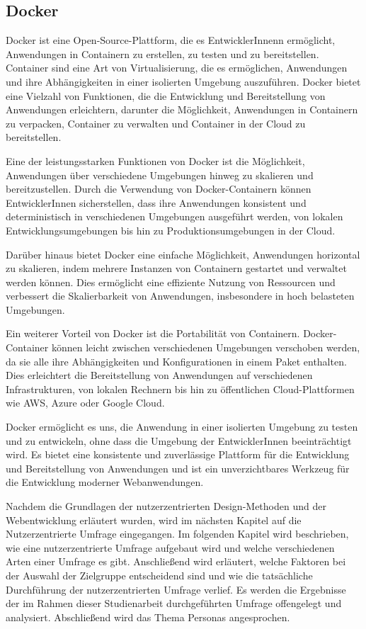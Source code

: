 \subsection{Docker}

Docker ist eine Open-Source-Plattform, die es EntwicklerInnenn ermöglicht, Anwendungen in Containern zu erstellen, zu testen und zu bereitstellen. Container sind eine Art von Virtualisierung, die es ermöglichen, Anwendungen und ihre Abhängigkeiten in einer isolierten Umgebung auszuführen. Docker bietet eine Vielzahl von Funktionen, die die Entwicklung und Bereitstellung von Anwendungen erleichtern, darunter die Möglichkeit, Anwendungen in Containern zu verpacken, Container zu verwalten und Container in der Cloud zu bereitstellen.

Eine der leistungsstarken Funktionen von Docker ist die Möglichkeit, Anwendungen über verschiedene Umgebungen hinweg zu skalieren und bereitzustellen. Durch die Verwendung von Docker-Containern können EntwicklerInnen sicherstellen, dass ihre Anwendungen konsistent und deterministisch in verschiedenen Umgebungen ausgeführt werden, von lokalen Entwicklungsumgebungen bis hin zu Produktionsumgebungen in der Cloud.

Darüber hinaus bietet Docker eine einfache Möglichkeit, Anwendungen horizontal zu skalieren, indem mehrere Instanzen von Containern gestartet und verwaltet werden können. Dies ermöglicht eine effiziente Nutzung von Ressourcen und verbessert die Skalierbarkeit von Anwendungen, insbesondere in hoch belasteten Umgebungen.

Ein weiterer Vorteil von Docker ist die Portabilität von Containern. Docker-Container können leicht zwischen verschiedenen Umgebungen verschoben werden, da sie alle ihre Abhängigkeiten und Konfigurationen in einem Paket enthalten. Dies erleichtert die Bereitstellung von Anwendungen auf verschiedenen Infrastrukturen, von lokalen Rechnern bis hin zu öffentlichen Cloud-Plattformen wie AWS, Azure oder Google Cloud.

Docker ermöglicht es uns, die Anwendung in einer isolierten Umgebung zu testen und zu entwickeln, ohne dass die Umgebung der EntwicklerInnen beeinträchtigt wird. Es bietet eine konsistente und zuverlässige Plattform für die Entwicklung und Bereitstellung von Anwendungen und ist ein unverzichtbares Werkzeug für die Entwicklung moderner Webanwendungen. \cite{docker}


Nachdem die Grundlagen der nutzerzentrierten Design-Methoden und der Webentwicklung erläutert wurden, wird im nächsten Kapitel auf die Nutzerzentrierte Umfrage eingegangen. Im folgenden Kapitel wird beschrieben, wie eine nutzerzentrierte Umfrage aufgebaut wird und welche verschiedenen Arten einer Umfrage es gibt. Anschließend wird erläutert, welche Faktoren bei der Auswahl der Zielgruppe entscheidend sind und wie die tatsächliche Durchführung der nutzerzentrierten Umfrage verlief. Es werden die Ergebnisse der im Rahmen dieser Studienarbeit durchgeführten Umfrage offengelegt und analysiert. Abschließend wird das Thema Personas angesprochen.
